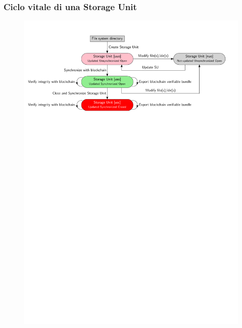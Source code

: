 \documentclass{beamer}
\begin{document}
\begin{frame}
	\frametitle{Ciclo vitale di una Storage Unit}
	\centering
	\begin{figure}
		\includegraphics[width=\textwidth]{figures/stateDiag2.pdf}
	\end{figure}
\end{frame}
\end{document}
